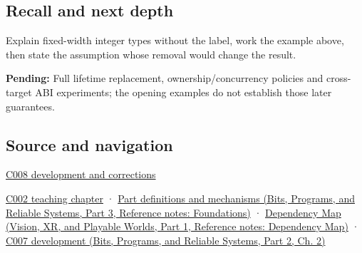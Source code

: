 \subsection{Recall and next depth}\label{appendix-cc04044b5782-recall-and-next-depth}

\hypertarget{appendix-cc04044b5782-recall-and-next-depth}{}

Explain fixed-width integer types without the label, work the example above, then state the assumption whose removal would change the result.

\textbf{Pending:} Full lifetime replacement, ownership/concurrency policies and cross-target ABI experiments; the opening examples do not establish those later guarantees.

\subsection{Source and navigation}\label{appendix-cc04044b5782-source-and-navigation}

\hypertarget{appendix-cc04044b5782-source-and-navigation}{}

\hyperref[appendix-fd090d982a15-m008---parts-113-126]{C008 development and corrections}

\hyperref[01-foundations-i-ch001-arithmetic-becomes-a-policy]{C002 teaching chapter} · \href{../01-Bits-Programs-and-Reliable-Systems-P03/main.pdf\#nameddest=appendix-fd090d982a15}{Part definitions and mechanisms (Bits, Programs, and Reliable Systems, Part 3, Reference notes: Foundations)} · \href{../07-Vision-XR-and-Playable-Worlds-P01/main.pdf\#nameddest=appendix-4ad47bdd269a}{Dependency Map (Vision, XR, and Playable Worlds, Part 1, Reference notes: Dependency Map)} · \href{../01-Bits-Programs-and-Reliable-Systems-P02/main.pdf\#nameddest=01-foundations-i-ch002-choose-a-type-for-its-promise-not-its-familiar-size}{C007 development (Bits, Programs, and Reliable Systems, Part 2, Ch. 2)}

